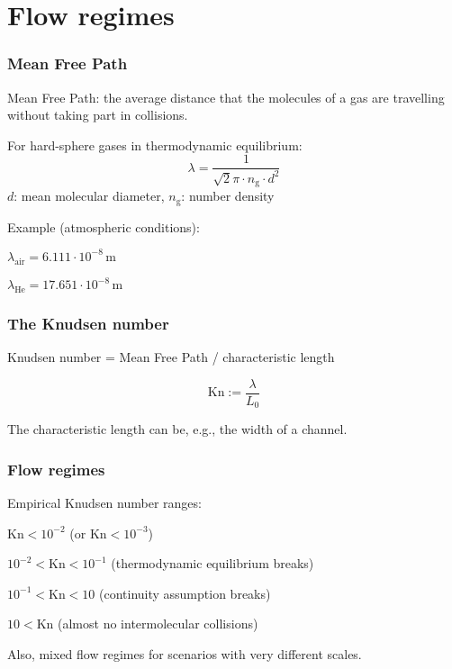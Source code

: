 \documentclass{beamer}
\begin{document}
\section{Flow regimes}

\begin{frame}
 \frametitle{Mean Free Path}
 
 Mean Free Path: the average distance that the molecules 
 of a gas are travelling without taking part in collisions.
 
 For hard-sphere gases in thermodynamic equilibrium:
  \begin{equation}
    \lambda = \frac{1}{\sqrt{2} \pi \cdot n_\mathrm{g} \cdot d^2}
    \label{eq:MFP}
  \end{equation}
  $d$: mean molecular diameter, $n_\mathrm{g}$: number density
  
  
  Example (atmospheric conditions):
  
  $\lambda_{\mathrm{air}} = 6.111\cdot10^{-8}\,\mathrm{m}$
  
  $\lambda_{\mathrm{He}} = 17.651\cdot10^{-8}\,\mathrm{m}$
 
\end{frame}


\begin{frame}
 \frametitle{The Knudsen number}
 
 Knudsen number = Mean Free Path / characteristic length
 
 \begin{equation}
 \mathrm{Kn} := \frac{\lambda}{L_0}
 \label{eq:Kn_def}
\end{equation}
 
 The characteristic length can be, e.g.\@, the width of a channel.

\end{frame}


\begin{frame}
 \frametitle{Flow regimes}
 
 Empirical Knudsen number ranges:
 \begin{description}
  \item[Continuous] $\mathrm{Kn}<10^{-2}$ (or $\mathrm{Kn}<10^{-3}$)
  \item[Slip] $10^{-2} < \mathrm{Kn} < 10^{-1} $ (thermodynamic equilibrium breaks)
  \item[Transition] $10^{-1} < \mathrm{Kn} < 10 $ (continuity assumption breaks)
  \item[Free molecular] $10 < \mathrm{Kn}$ (almost no intermolecular collisions)
 \end{description}

 Also, mixed flow regimes for scenarios with very different scales.
\end{frame}
\end{document}
